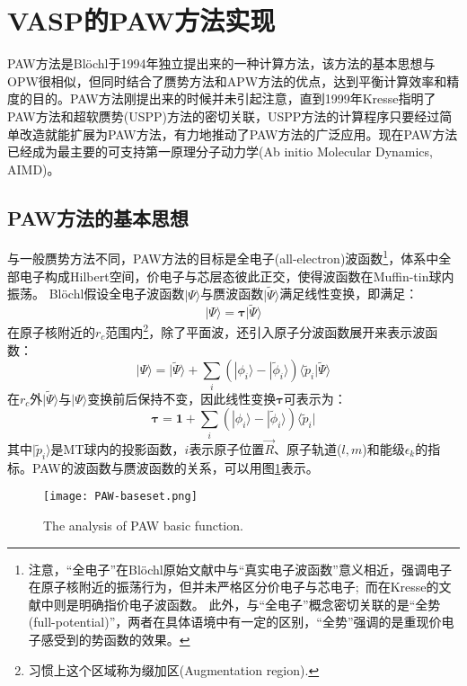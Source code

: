 \section{VASP的PAW方法实现}
\textrm{PAW}方法是\textrm{Bl\"ochl}于1994年独立提出来的一种计算方法，该方法的基本思想与\textrm{OPW}很相似，但同时结合了赝势方法和\textrm{APW}方法的优点，达到平衡计算效率和精度的目的。\textrm{PAW}方法刚提出来的时候并未引起注意，直到1999年\textrm{Kresse}指明了\textrm{PAW}方法和超软赝势(\textrm{USPP})方法的密切关联，\textrm{USPP}方法的计算程序只要经过简单改造就能扩展为\textrm{PAW}方法，有力地推动了\textrm{PAW}方法的广泛应用。现在\textrm{PAW}方法已经成为最主要的可支持第一原理分子动力学\textrm{(Ab initio Molecular Dynamics, AIMD)}。

\subsection{PAW方法的基本思想}
与一般赝势方法不同，\textrm{PAW}方法的目标是全电子(\textrm{all-electron})波函数\footnote{注意，“全电子”在\textrm{Bl\"ochl}原始文献\cite{PRB50-17953_1994}中与“真实电子波函数”意义相近，强调电子在原子核附近的振荡行为，但并未严格区分价电子与芯电子;~而在\textrm{Kresse}的文献\cite{PRB59-1758_1999}中则是明确指价电子波函数。%
此外，与“全电子”概念密切关联的是“全势(\textrm{full-potential})”，两者在具体语境中有一定的区别，“全势”强调的是重现价电子感受到的势函数的效果。}，体系中全部电子构成\textrm{Hilbert}空间，价电子与芯层态彼此正交，使得波函数在\textrm{Muffin-tin}球内振荡。
\textrm{Bl\"ochl}假设全电子波函数$|\Psi\rangle$与赝波函数$|\tilde\Psi\rangle$满足线性变换，即满足：
\begin{equation}
	|\Psi\rangle=\mathbf{\tau|}\tilde\Psi\rangle
	\label{eq:PAW-Blochl-01}
\end{equation}
在原子核附近的$r_c$范围内\footnote{习惯上这个区域称为缀加区(\textrm{Augmentation region}).}，除了平面波，还引入原子分波函数展开来表示波函数：
\begin{equation}
	|\Psi\rangle=|\tilde\Psi\rangle+\sum_i(|\phi_i\rangle-|\tilde\phi_i\rangle)\langle\tilde p_i|\tilde\Psi\rangle
	\label{eq:PAW-Blochl-02}
\end{equation}
在$r_c$外$|\tilde\Psi\rangle$与$|\Psi\rangle$变换前后保持不变，因此线性变换$\mathbf{\tau}$可表示为：
\begin{equation}
	\mathbf{\tau}=\mathbf{1}+\sum_i(|\phi_i\rangle-|\tilde\phi_i\rangle)\langle\tilde p_i|
	\label{eq:PAW-Blochl-03}
\end{equation}
其中$|\tilde p_i\rangle$是\textrm{MT}球内的投影函数，$i$表示原子位置$\vec R$、原子轨道($l,m$)和能级$\epsilon_k$的指标。\textrm{PAW}的波函数与赝波函数的关系，可以用图\ref{PAW_basic}表示。
\begin{figure}[h!]
\centering
\texttt{[image: PAW-baseset.png]}
\caption{\small \textrm{The analysis of PAW basic function.}}%
\label{PAW_basic}
\end{figure}

